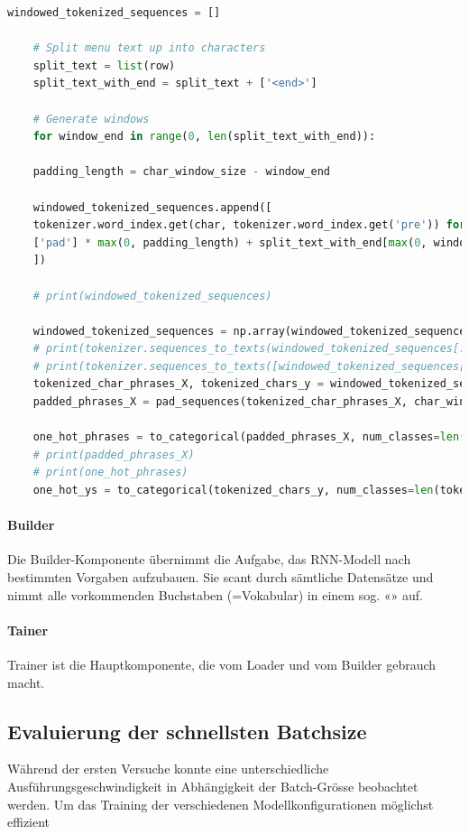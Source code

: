 \begin{lstlisting}[language=Python, caption=Encoding, label=lst:one-hot-encoding]
    windowed_tokenized_sequences = []

    # Split menu text up into characters
    split_text = list(row)
    split_text_with_end = split_text + ['<end>']

    # Generate windows
    for window_end in range(0, len(split_text_with_end)):

    padding_length = char_window_size - window_end

    windowed_tokenized_sequences.append([
    tokenizer.word_index.get(char, tokenizer.word_index.get('pre')) for char in (
    ['pad'] * max(0, padding_length) + split_text_with_end[max(0, window_end-char_window_size):window_end + 1])
    ])

    # print(windowed_tokenized_sequences)

    windowed_tokenized_sequences = np.array(windowed_tokenized_sequences)
    # print(tokenizer.sequences_to_texts(windowed_tokenized_sequences[:, :-1]))
    # print(tokenizer.sequences_to_texts([windowed_tokenized_sequences[:, -1]]))
    tokenized_char_phrases_X, tokenized_chars_y = windowed_tokenized_sequences[:, :-1], windowed_tokenized_sequences[:, -1]
    padded_phrases_X = pad_sequences(tokenized_char_phrases_X, char_window_size)

    one_hot_phrases = to_categorical(padded_phrases_X, num_classes=len(tokenizer.index_word) + 1)
    # print(padded_phrases_X)
    # print(one_hot_phrases)
    one_hot_ys = to_categorical(tokenized_chars_y, num_classes=len(tokenizer.index_word) + 1)
\end{lstlisting}


\paragraph{Builder} Die Builder-Komponente übernimmt die Aufgabe, das RNN-Modell nach bestimmten Vorgaben aufzubauen.
Sie scant durch sämtliche Datensätze und nimmt alle vorkommenden Buchstaben (=Vokabular) in einem sog. «» auf.

\paragraph{Tainer} Trainer ist die Hauptkomponente, die vom Loader und vom Builder gebrauch macht.

\subsection{Evaluierung der schnellsten Batchsize}
\label{sec:evaluating-fastest-batchsize}
Während der ersten Versuche konnte eine unterschiedliche Ausführungsgeschwindigkeit in Abhängigkeit der Batch-Grösse beobachtet werden.
Um das Training der verschiedenen Modellkonfigurationen möglichst effizient

